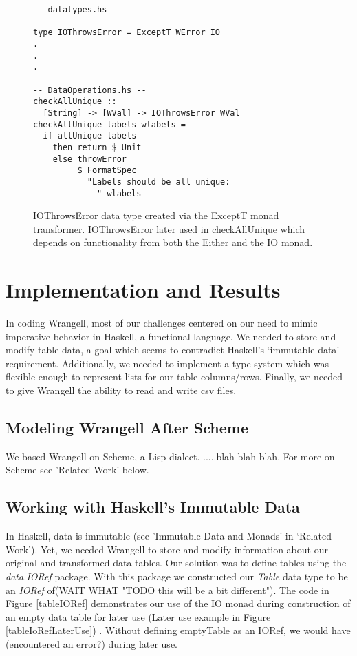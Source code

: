 \documentclass[preprint,nocopyrightspace]{sig-alternate}
\begin{document}
\begin{figure}
\begin{lstlisting}
-- datatypes.hs --

type IOThrowsError = ExceptT WError IO
.
.
.

-- DataOperations.hs --
checkAllUnique :: 
  [String] -> [WVal] -> IOThrowsError WVal
checkAllUnique labels wlabels = 
  if allUnique labels
    then return $ Unit 
    else throwError 
         $ FormatSpec 
           "Labels should be all unique: 
             " wlabels

\end{lstlisting}
\caption{IOThrowsError data type created via the ExceptT monad transformer. IOThrowsError later used in checkAllUnique which depends on functionality from both the Either and the IO monad.}
\label{IOThrowsError}
\end{figure}

  

\section{Implementation and Results}

In coding Wrangell, most of our challenges centered on our need to mimic imperative behavior in Haskell, a functional language. We needed to store and modify table data, a goal which seems to contradict Haskell's `immutable data' requirement. Additionally, we needed to implement a type system which was flexible enough to represent lists for our table columns/rows. Finally, we needed to give Wrangell the ability to read and write csv files.  

\subsection{Modeling Wrangell After Scheme}
We based Wrangell on Scheme, a Lisp dialect. .....blah blah blah. For more on Scheme see 'Related Work' below. 


\subsection{Working with Haskell's Immutable Data}
In Haskell, data is immutable (see 'Immutable Data and Monads' in `Related Work'). Yet, we needed Wrangell to store and modify information about our original and transformed data tables. Our solution was to define tables using the \emph{data.IORef} package. With this package we constructed our \emph{Table} data type to be an \emph{IORef} of(WAIT WHAT "TODO this will be a bit different"). The code in Figure \ref{tableIORef} demonstrates our use of the IO monad during construction of an empty data table for later use (Later use example in Figure \ref{tableIoRefLaterUse}) . 
Without defining emptyTable as an IORef, we would have (encountered an error?) during later use. 
\end{document}
